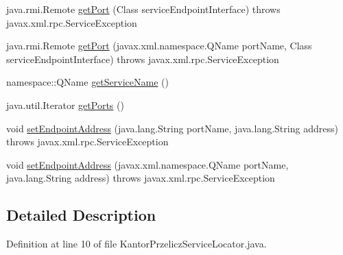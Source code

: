 \begin{DoxyCompactItemize}
\item 
java.\+rmi.\+Remote \hyperlink{classkantor_1_1com_1_1web_1_1service_1_1_kantor_przelicz_service_locator_a4aa2065a153ea8e2e1ccab1894bbbc37}{get\+Port} (Class service\+Endpoint\+Interface)  throws javax.\+xml.\+rpc.\+Service\+Exception 
\item 
java.\+rmi.\+Remote \hyperlink{classkantor_1_1com_1_1web_1_1service_1_1_kantor_przelicz_service_locator_a6d8e3e4baf75c16aeac993e9d4998839}{get\+Port} (javax.\+xml.\+namespace.\+Q\+Name port\+Name, Class service\+Endpoint\+Interface)  throws javax.\+xml.\+rpc.\+Service\+Exception 
\item 
namespace\+::\+Q\+Name \hyperlink{classkantor_1_1com_1_1web_1_1service_1_1_kantor_przelicz_service_locator_a3b49409dee758204c5dfc98987cb62de}{get\+Service\+Name} ()
\item 
java.\+util.\+Iterator \hyperlink{classkantor_1_1com_1_1web_1_1service_1_1_kantor_przelicz_service_locator_ab37fd7796040d007ea741ded07b244db}{get\+Ports} ()
\item 
void \hyperlink{classkantor_1_1com_1_1web_1_1service_1_1_kantor_przelicz_service_locator_a64ea44a37ba21261465cd6c890c41c81}{set\+Endpoint\+Address} (java.\+lang.\+String port\+Name, java.\+lang.\+String address)  throws javax.\+xml.\+rpc.\+Service\+Exception 
\item 
void \hyperlink{classkantor_1_1com_1_1web_1_1service_1_1_kantor_przelicz_service_locator_af022bb28eeb7193ad2a6f5db9abcef45}{set\+Endpoint\+Address} (javax.\+xml.\+namespace.\+Q\+Name port\+Name, java.\+lang.\+String address)  throws javax.\+xml.\+rpc.\+Service\+Exception 
\end{DoxyCompactItemize}


\subsection{Detailed Description}


Definition at line 10 of file Kantor\+Przelicz\+Service\+Locator.\+java.



